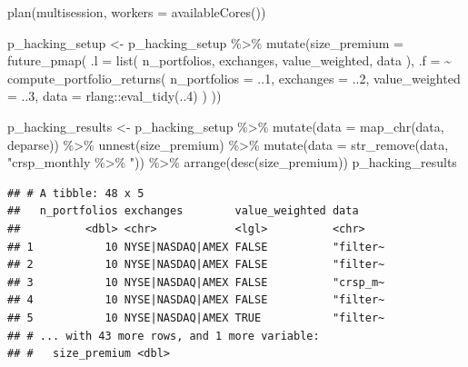 \documentclass[
]{krantz}
\newenvironment{Shaded}{\begin{snugshade}}{\end{snugshade}}
\newcommand{\AttributeTok}[1]{\textcolor[rgb]{0.61,0.61,0.61}{#1}}
\newcommand{\DecValTok}[1]{\textcolor[rgb]{0.06,0.06,0.06}{#1}}
\newcommand{\FunctionTok}[1]{\textcolor[rgb]{0,0,0}{#1}}
\newcommand{\NormalTok}[1]{#1}
\newcommand{\OtherTok}[1]{\textcolor[rgb]{0.37,0.37,0.37}{#1}}
\newcommand{\SpecialCharTok}[1]{\textcolor[rgb]{0,0,0}{#1}}
\newcommand{\StringTok}[1]{\textcolor[rgb]{0.5,0.5,0.5}{#1}}
\begin{document}
\begin{Shaded}
\begin{Highlighting}[]
\FunctionTok{plan}\NormalTok{(multisession, }\AttributeTok{workers =} \FunctionTok{availableCores}\NormalTok{())}

\NormalTok{p\_hacking\_setup }\OtherTok{\textless{}{-}}\NormalTok{ p\_hacking\_setup }\SpecialCharTok{\%\textgreater{}\%}
  \FunctionTok{mutate}\NormalTok{(}\AttributeTok{size\_premium =} \FunctionTok{future\_pmap}\NormalTok{(}
    \AttributeTok{.l =} \FunctionTok{list}\NormalTok{(}
\NormalTok{      n\_portfolios,}
\NormalTok{      exchanges,}
\NormalTok{      value\_weighted,}
\NormalTok{      data}
\NormalTok{    ),}
    \AttributeTok{.f =} \SpecialCharTok{\textasciitilde{}} \FunctionTok{compute\_portfolio\_returns}\NormalTok{(}
      \AttributeTok{n\_portfolios =}\NormalTok{ ..}\DecValTok{1}\NormalTok{,}
      \AttributeTok{exchanges =}\NormalTok{ ..}\DecValTok{2}\NormalTok{,}
      \AttributeTok{value\_weighted =}\NormalTok{ ..}\DecValTok{3}\NormalTok{,}
      \AttributeTok{data =}\NormalTok{ rlang}\SpecialCharTok{::}\FunctionTok{eval\_tidy}\NormalTok{(..}\DecValTok{4}\NormalTok{)}
\NormalTok{    )}
\NormalTok{  ))}

\NormalTok{p\_hacking\_results }\OtherTok{\textless{}{-}}\NormalTok{ p\_hacking\_setup }\SpecialCharTok{\%\textgreater{}\%}
  \FunctionTok{mutate}\NormalTok{(}\AttributeTok{data =} \FunctionTok{map\_chr}\NormalTok{(data, deparse)) }\SpecialCharTok{\%\textgreater{}\%}
  \FunctionTok{unnest}\NormalTok{(size\_premium) }\SpecialCharTok{\%\textgreater{}\%}
  \FunctionTok{mutate}\NormalTok{(}\AttributeTok{data =} \FunctionTok{str\_remove}\NormalTok{(data, }\StringTok{"crsp\_monthly \%\textgreater{}\% "}\NormalTok{)) }\SpecialCharTok{\%\textgreater{}\%}
  \FunctionTok{arrange}\NormalTok{(}\FunctionTok{desc}\NormalTok{(size\_premium))}
\NormalTok{p\_hacking\_results}
\end{Highlighting}
\end{Shaded}

\begin{verbatim}
## # A tibble: 48 x 5
##   n_portfolios exchanges        value_weighted data    
##          <dbl> <chr>            <lgl>          <chr>   
## 1           10 NYSE|NASDAQ|AMEX FALSE          "filter~
## 2           10 NYSE|NASDAQ|AMEX FALSE          "filter~
## 3           10 NYSE|NASDAQ|AMEX FALSE          "crsp_m~
## 4           10 NYSE|NASDAQ|AMEX FALSE          "filter~
## 5           10 NYSE|NASDAQ|AMEX TRUE           "filter~
## # ... with 43 more rows, and 1 more variable:
## #   size_premium <dbl>
\end{verbatim}
\end{document}
